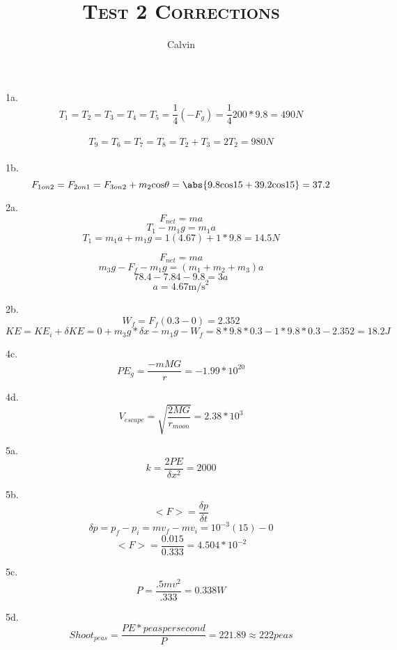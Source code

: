 \documentclass[fontsize=12pt]{scrartcl}
\title{
\normalfont \normalsize
\textsc{Test 2 Corrections}}
\author{Calvin}
\begin{document}
\maketitle

1a.\\
$$T_{1}=T_{2}=T_{3}=T_{4}=T_{5}=\frac{1}{4}(-F_{g})=\frac{1}{4}200*9.8=490N$$\\
$$T_{9}=T_{6}=T_{7}=T_{8}=T_{2}+T_{3}=2T_{2}=980N$$\\

1b.
$$F_{1on2}=F_{2on1}=F_{3on2}+m_{2} \text{cos}\theta =\abs{9.8\text{cos}15+39.2\text{cos}15}=37.2$$


2a.
$$F_{net}=ma$$
$$T_{1}-m_{1}g=m_{1}a$$
$$T_{1}=m_{1}a+m_{1}g=1(4.67)+1*9.8=14.5N$$

$$F_{net}=ma$$
$$m_{3}g-F_{f}-m_{1}g=(m_{1}+m_{2}+m_{3})a$$
$$78.4-7.84-9.8=3a$$
$$a=4.67\text{m/s}^{2}$$

2b.
$$W_{f}=F_{f}(0.3-0)=2.352$$
$$KE=KE_{i}+\delta KE=0+m_{3}g*\delta x-m_{1}g-W_{f}=8*9.8*0.3-1*9.8*0.3-2.352=18.2J$$


4c.
$$PE_{g}=\frac{-mMG}{r}=-1.99*10^{20}$$

4d.
$$V_{escape}=\sqrt{\frac{2MG}{r_{moon}}}=2.38*10^{3}$$



5a.
$$k=\frac{2PE}{\delta x^{2}}=2000$$

5b.
$$<F>=\frac{\delta p}{\delta t}$$
$$\delta p=p_{f}-p_{i}=mv_{f}-mv_{i}=10^{-3}(15)-0$$
$$<F>=\frac{0.015}{0.333}=4.504*10^{-2}$$

5c.
$$P=\frac{.5mv^{2}}{.333}=0.338W$$

5d.
$$Shoot_{peas}=\frac{PE*peaspersecond}{P}=221.89\approx 222peas$$
\end{document}
